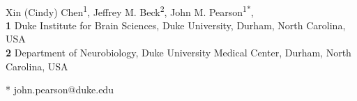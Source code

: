 \documentclass[10pt,letterpaper]{article}
\date{}
\begin{document}
\vspace*{0.2in}

\begin{flushleft}
{\Large
\textbf{} %
}
\newline
\\
Xin (Cindy) Chen\textsuperscript{1},
Jeffrey M. Beck\textsuperscript{2},
John M. Pearson\textsuperscript{1*},
\\
\bigskip
\textbf{1} Duke Institute for Brain Sciences, Duke University, Durham, North Carolina, USA
\\
\textbf{2} Department of Neurobiology, Duke University Medical Center, Durham, North Carolina, USA
\\
\bigskip

% 
%


* john.pearson@duke.edu

\end{flushleft}
\end{document}
